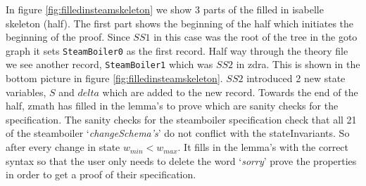 
In figure \ref{fig:filledinsteamskeleton} we show 3 parts of the filled in
isabelle skeleton (\gls{half}). The first part shows the beginning of the
\gls{half} which initiates the beginning of the proof. Since $SS1$ in this case
was the root of the tree in the goto graph it sets \verb|SteamBoiler0| as the
first record. Half way through the theory file we see another record,
\verb|SteamBoiler1| which was $SS2$ in \gls{zdra}. This is shown in the bottom
picture in figure \ref{fig:filledinsteamskeleton}. $SS2$ introduced 2 new state
variables, $S$ and $delta$ which are added to the new record. Towards the end of
the \gls{half}, \gls{zmath} has filled in the lemma's to prove which are sanity
checks for the specification.
The sanity checks for the steamboiler specification check that all 21 of the 
steamboiler `\textit{changeSchema's}' do not conflict with the stateInvariants.
So after every change in state $w_{min}<w_{max}$.
It fills in the lemma's with the correct syntax so
that the user only needs to delete the word `\emph{sorry}' prove the properties
in order to get a proof of their specification. 

